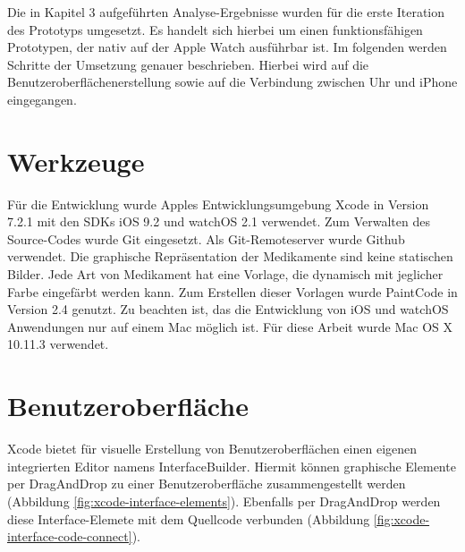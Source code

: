 
Die in Kapitel 3 aufgeführten Analyse-Ergebnisse wurden für die erste Iteration des Prototyps umgesetzt. Es handelt sich hierbei um einen funktionsfähigen Prototypen, der nativ auf der Apple Watch ausführbar ist. Im folgenden werden Schritte der Umsetzung genauer beschrieben. Hierbei wird auf die Benutzeroberflächenerstellung sowie auf die Verbindung zwischen Uhr und iPhone eingegangen.

\section{Werkzeuge}
\label{ch:tools}
Für die Entwicklung wurde Apples Entwicklungsumgebung Xcode in Version 7.2.1 mit den SDKs iOS 9.2 und watchOS 2.1 verwendet. Zum Verwalten des Source-Codes wurde Git\cite{git} eingesetzt. Als Git-Remoteserver wurde Github \cite{github} verwendet. Die graphische Repräsentation der Medikamente sind keine statischen Bilder. Jede Art von Medikament hat eine Vorlage, die dynamisch mit jeglicher Farbe eingefärbt werden kann. Zum Erstellen dieser Vorlagen wurde PaintCode in Version 2.4 \cite{paintCode} genutzt. Zu beachten ist, das die Entwicklung von iOS und watchOS Anwendungen nur auf einem Mac möglich ist. Für diese Arbeit wurde Mac OS X 10.11.3 verwendet.

\section{Benutzeroberfläche}
\label{ch:userinterface}
Xcode bietet für visuelle Erstellung von Benutzeroberflächen einen eigenen integrierten Editor namens InterfaceBuilder. Hiermit können graphische Elemente per DragAndDrop zu einer Benutzeroberfläche zusammengestellt werden (Abbildung \ref{fig:xcode-interface-elements}). Ebenfalls per DragAndDrop werden diese Interface-Elemete mit dem Quellcode verbunden (Abbildung \ref{fig:xcode-interface-code-connect}).


